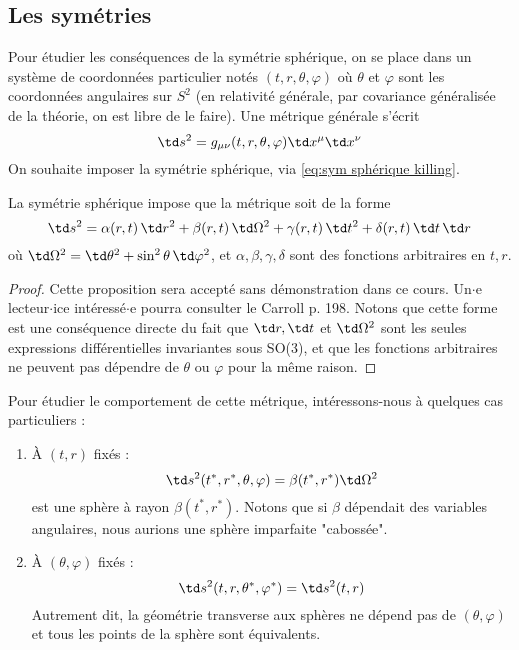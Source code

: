 \subsection{Les symétries}
Pour étudier les conséquences de la symétrie sphérique, on se place dans un système de coordonnées particulier notés $(t,r,\theta,\varphi)$ où $\theta$ et $\varphi$ sont les coordonnées angulaires sur $S^2$ (en relativité générale, par covariance généralisée de la théorie, on est libre de le faire). Une métrique générale s'écrit
\begin{equation}
    \td s^2 = g_{\mu\nu}(t,r,\theta,\varphi) \td x^\mu \td x^\nu
\end{equation}
On souhaite imposer la symétrie sphérique, via \ref{eq:sym sphérique killing}.
\begin{theoremframe}
    \begin{prop}
        La symétrie sphérique impose que la métrique soit de la forme
        \begin{equation}
            \label{def: métrique à symétrie sphérique}
            \td s^2 = \alpha (r,t)\, \td r^2 + \beta (r,t)\, \td \Omega^2 + \gamma(r,t) \,\td t^2 + \delta (r,t) \, \td t \,\td r
        \end{equation}
        où $\td \Omega^2 = \td \theta^2 + \sin^2\theta \, \td \varphi^2$, et $\alpha,\beta,\gamma,\delta$ sont des fonctions arbitraires en $t,r$.
    \end{prop}
\end{theoremframe}
\begin{proof}
    Cette proposition sera accepté sans démonstration dans ce cours. Un$\cdot$e lecteur$\cdot$ice intéressé$\cdot$e pourra consulter le Carroll p. 198. Notons que cette forme est une conséquence directe du fait que $\td r, \td t$ et $\td\Omega^2$ sont les seules expressions différentielles invariantes sous SO(3), et que les fonctions arbitraires ne peuvent pas dépendre de $\theta$ ou $\varphi$ pour la même raison.
\end{proof}
Pour étudier le comportement de cette métrique, intéressons-nous à quelques cas particuliers :
\begin{enumerate}
    \item À $(t,r)$ fixés :
    \begin{equation}
        \td s^2 (t^*,r^*,\theta,\varphi ) = \beta (t^*,r^*) \td \Omega^2
    \end{equation}
    est une sphère à rayon $\beta (t^*,r^*)$. Notons que si $\beta$ dépendait des variables angulaires, nous aurions une sphère imparfaite "cabossée".
    \item À $(\theta,\varphi)$ fixés :
    \begin{equation}
        \td s^2 (t,r,\theta^*,\varphi^*) = \td s^2 (t,r)
    \end{equation}
    Autrement dit, la géométrie transverse aux sphères ne dépend pas de $(\theta,\varphi)$ et tous les points de la sphère sont équivalents.
\end{enumerate}
